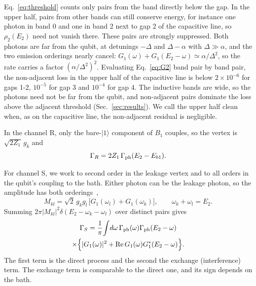\documentclass[aps,prresearch,twocolumn,superscriptaddress,nofootinbib,longbibliography,floatfix]{revtex4-2}
\begin{document}
Eq.~\eqref{eq:threshold} counts only pairs from the band directly below the gap. In the
upper half, pairs from other bands can still conserve energy, for instance one photon in band 0 and one in band 2 next
to gap 2 of the capacitive line, so $\rho_2(E_2)$ need not vanish there. These pairs are strongly suppressed. Both
photons are far from the qubit, at detunings $-\Delta$ and $\Delta-\alpha$ with $\Delta\gg\alpha$, and the two
emission orderings nearly cancel: $G_1(\omega)+G_1(E_2-\omega)\simeq\alpha/\Delta^2$, so the rate carries a factor
$(\alpha/\Delta^2)^2$. Evaluating Eq.~\eqref{eq:G2} band pair by band pair, the non-adjacent loss in the upper half of
the capacitive line is below $2\times10^{-6}$ for gaps 1-2, $10^{-5}$ for gap 3 and $10^{-4}$ for gap 4. The
inductive bands are wide, so the photons need not be far from the qubit, and non-adjacent pairs dominate the loss
above the adjacent threshold (Sec.~\ref{sec:results}). We call the upper half clean when, as on the capacitive
line, the non-adjacent residual is negligible.


In the channel R, only the bare-$|1\rangle$ component of $B_1$ couples, so the vertex is $\sqrt{2Z_1}\,g_k$ and
\begin{equation}
\Gamma_R=2Z_1\,\Gamma_{\rm ph}(E_2-E_{b1}).
\end{equation}

For channel S, we work to second order in the leakage vertex and to all orders in the qubit's coupling to the bath.
Either photon can be the leakage photon, so the amplitude has both orderings~\cite{GoeppertMayer1931,BreitTeller1940,DaltonGarraway2003},
\begin{equation}
M_{kl}=\sqrt2\,g_kg_l\,\big[G_1(\omega_l)+G_1(\omega_k)\big],\qquad\omega_k+\omega_l=E_2 .
\label{eq:M}
\end{equation}
Summing $2\pi|M_{kl}|^2\delta(E_2-\omega_k-\omega_l)$ over distinct pairs gives
\begin{multline}
\Gamma_{S}=\frac1\pi\!\int\!d\omega\,\Gamma_{\rm ph}(\omega)\Gamma_{\rm ph}(E_2-\omega)\\
\times\Big\{|G_1(\omega)|^2+\mathrm{Re}\,G_1(\omega)G_1^*(E_2-\omega)\Big\}.
\label{eq:G2}
\end{multline}
The first term is the direct process and the second the exchange (interference) term. The exchange term is comparable
to the direct one, and its sign depends on the bath.
\end{document}
